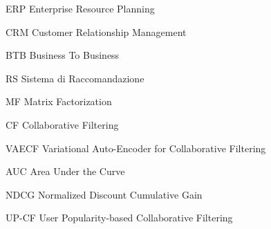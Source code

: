 
\begin{abbreviations}

\item[ERP] Enterprise Resource Planning
\item[CRM] Customer Relationship Management 
\item[BTB] Business To Business
\item[RS] Sistema di Raccomandazione
\item[MF] Matrix Factorization
\item[CF] Collaborative Filtering
\item[VAECF] Variational Auto-Encoder for Collaborative Filtering     
\item[AUC] Area Under the Curve
\item[NDCG] Normalized Discount Cumulative Gain
\item[UP-CF] User Popularity-based Collaborative Filtering

\end{abbreviations}